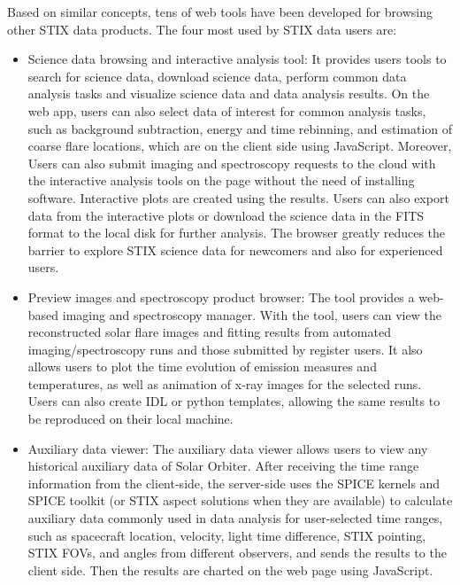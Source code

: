 \documentclass[referee]{aa} %
\begin{document}
Based on similar concepts, tens of web tools have been developed for 
browsing other STIX data products. 
The four most used by STIX data users are: 
\begin{itemize}
  \item  Science data browsing and interactive analysis tool:
  It provides users tools to search for science data, 
  download science data, 
  perform common data analysis tasks and visualize science data and
  data analysis results. 
  On the web app, users can also select data of interest  
  for common analysis tasks, such as background subtraction, energy and time rebinning, 
  and estimation of coarse flare locations, which are on the client side using JavaScript.
Moreover, Users can also submit imaging and spectroscopy requests to the cloud with the
 interactive analysis tools on the page without the need of installing software. 
 Interactive plots are created using the results. Users can also export data from the interactive plots or 
  download the science data in the FITS format to the local disk for further analysis. 
  The browser greatly reduces the barrier to explore STIX science data for newcomers and also 
  for experienced users. 

  \item  Preview images and spectroscopy product browser:
  The tool provides a web-based imaging and spectroscopy manager. With the tool, users can view the 
  reconstructed solar flare images and fitting results from 
  automated imaging/spectroscopy runs and those submitted by register users. 
  It also allows users to plot the time evolution of emission measures and temperatures, as well as animation of x-ray images 
  for the selected runs.  Users can also create IDL or python templates, allowing the same results to be reproduced on their local machine.


  \item  Auxiliary data viewer: 
  The auxiliary data viewer allows users to view any historical auxiliary data of Solar Orbiter. 
  After receiving the time range information from the client-side,
  the server-side uses the SPICE kernels and SPICE toolkit (or STIX aspect solutions when they are available) to calculate 
  auxiliary data commonly used in data analysis for user-selected time ranges, 
  such as spacecraft location, velocity, light time difference, STIX pointing, 
   STIX FOVs, and angles from different observers, and sends the results to the client side. 
   Then the results are charted on the web page using JavaScript. 


\end{itemize}
\end{document}
